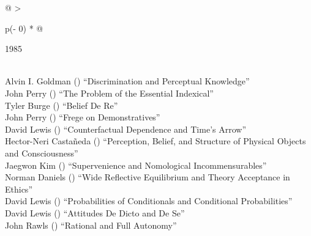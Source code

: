 \documentclass[
  10pt,
  letterpaper,
  DIV=11,
  numbers=noendperiod,
  twoside]{scrartcl}
\begin{document}
\begin{longtable}[]{@{}
  >{\raggedright\arraybackslash}p{(\columnwidth - 0\tabcolsep) * }@{}}

\caption{\label{tbl-top-ten-1976}Most cited articles published less than
ten years ago as of 1985.}

\tabularnewline

\toprule\noalign{}
\begin{minipage}[b]{\linewidth}\raggedright
1985
\end{minipage} \\
\midrule\noalign{}
\endhead
\bottomrule\noalign{}
\endlastfoot
Alvin I. Goldman
()
``Discrimination and Perceptual Knowledge'' \\
John Perry
()
``The Problem of the Essential Indexical'' \\
Tyler Burge
()
``Belief De Re'' \\
John Perry
()
``Frege on Demonstratives'' \\
David Lewis
()
``Counterfactual Dependence and Time's Arrow'' \\
Hector-Neri Castañeda
()
``Perception, Belief, and Structure of Physical Objects and
Consciousness'' \\
Jaegwon Kim
()
``Supervenience and Nomological Incommensurables'' \\
Norman Daniels
()
``Wide Reflective Equilibrium and Theory Acceptance in Ethics'' \\
David Lewis
()
``Probabilities of Conditionals and Conditional Probabilities'' \\
David Lewis
()
``Attitudes De Dicto and De Se'' \\
John Rawls
()
``Rational and Full Autonomy'' \\

\end{longtable}
\end{document}
